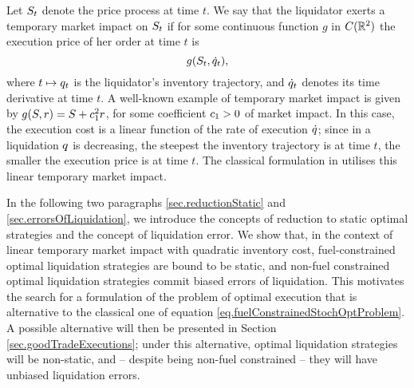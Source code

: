 \documentclass[10pt,a4paper]{article}
\begin{document}
Let $S_t$ denote the price process at time $t$. We say that the liquidator exerts a temporary market impact on $S_t$ if for some continuous function $g$ in $C(\mathbb{R}^{2})$ the execution price of her order at time $t$ is 
\begin{equation*}
g(S_t,\dot{q}_t),
\end{equation*} 
where $t\mapsto q_t$ is the liquidator's inventory trajectory, and $\dot{q}_{t}$ denotes its time derivative at time $t$. A well-known example of temporary market impact is given by $g(S,r) = S+c_{1}^{2} r$, for some coefficient $c_{1}>0$ of market impact. In this case, the execution cost is a linear function of the rate of execution $\dot{q}$; since in a liquidation $q$ is decreasing, the steepest the inventory trajectory is at time $t$, the smaller the execution price is at time $t$. The classical formulation in \cite{AC00opt} utilises this linear temporary market impact. 

In the following two paragraphs \ref{sec.reductionStatic} and \ref{sec.errorsOfLiquidation}, we introduce the concepts of reduction to static optimal strategies and the concept of liquidation error. We show that, in the context of linear temporary market impact with quadratic inventory cost, fuel-constrained optimal liquidation strategies are bound to be static, and non-fuel constrained optimal liquidation strategies commit biased errors of liquidation. This motivates the search for a formulation of the problem of optimal execution that is alternative to the classical one of equation \eqref{eq.fuelConstrainedStochOptProblem}. A possible alternative will then be presented in Section \ref{sec.goodTradeExecutions}; under this alternative, optimal liquidation strategies will be non-static, and -- despite being non-fuel constrained -- they will have unbiased liquidation errors.    
\end{document}
